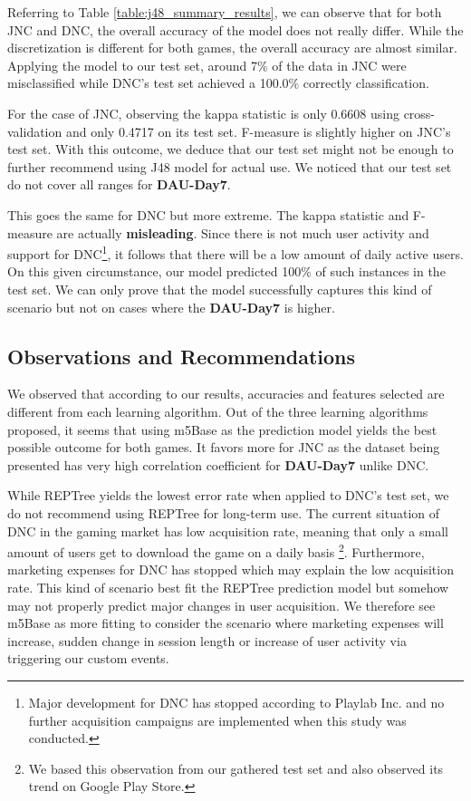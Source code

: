 Referring to Table \ref{table:j48_summary_results}, we can observe that for both JNC and DNC, the overall accuracy of the model does not really differ. While the discretization is different for both games, the overall accuracy are almost similar. Applying the model to our test set, around 7\% of the data in JNC were misclassified while DNC's test set achieved a 100.0\% correctly classification.

For the case of JNC, observing the kappa statistic is only 0.6608 using cross-validation and only 0.4717 on its test set. F-measure is slightly higher on JNC's test set. With this outcome, we deduce that our test set might not be enough to further recommend using J48 model for actual use. We noticed that our test set do not cover all ranges for \textbf{DAU-Day7}.

This goes the same for DNC but more extreme. The kappa statistic and F-measure are actually \textbf{misleading}. Since there is not much user activity and support for DNC\footnote{Major development for DNC has stopped according to Playlab Inc. and no further acquisition campaigns are implemented when this study was conducted.}, it follows that there will be a low amount of daily active users. On this given circumstance, our model predicted 100\% of such instances in the test set. We can only prove that the model successfully captures this kind of scenario but not on cases where the \textbf{DAU-Day7} is higher.

\subsection{Observations and Recommendations}
We observed that according to our results, accuracies and features selected are different from each learning algorithm. Out of the three learning algorithms proposed, it seems that using m5Base as the prediction model yields the best possible outcome for both games. It favors more for JNC as the dataset being presented has very high correlation coefficient for \textbf{DAU-Day7} unlike DNC.

While REPTree yields the lowest error rate when applied to DNC's test set, we do not recommend using REPTree for long-term use. The current situation of DNC in the gaming market has low acquisition rate, meaning that only a small amount of users get to download the game on a daily basis \footnote{We based this observation from our gathered test set and also observed its trend on Google Play Store.}. Furthermore, marketing expenses for DNC has stopped which may explain the low acquisition rate. This kind of scenario best fit the REPTree prediction model but somehow may not properly predict major changes in user acquisition. We therefore see m5Base as more fitting to consider the scenario where marketing expenses will increase, sudden change in session length or increase of user activity via triggering our custom events.

